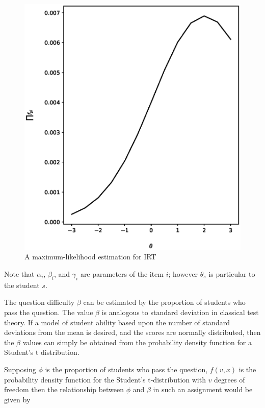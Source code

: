 \begin{figure}[p!]
 \label{fig:mle}
 \includegraphics{fig/mle.eps} 
 \caption{A maximum-likelihood estimation for IRT}
\end{figure}

Note that $\alpha_i$, $\beta_i$, and $\gamma_i$ are parameters of the item $i$;
however $\theta_s$ is particular to the student $s$.  

The question difficulty $\beta$ can be estimated by the proportion of students
who pass the question.  The value $\beta$ is analogous to standard deviation in
classical test theory.  If a model of student ability based upon the number of
standard deviations from the mean is desired, and the scores are normally
distributed, then the $\beta$ values can simply be obtained from the
probability density function for a Student's t distribution.

Supposing $\phi$ is the proportion of students who pass the question, $f(v, x)$
is the probability density function for the Student's t-distribution with $v$
degrees of freedom then the relationship between $\phi$ and $\beta$ in such an
assignment would be given by



